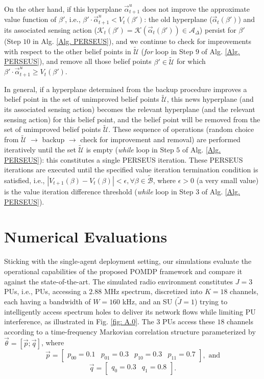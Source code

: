 \documentclass[12pt, draftcls, onecolumn]{IEEEtran}
\begin{document}
On the other hand, if this hyperplane $\vec{\alpha}_{t+1}^{u}$ does not improve the approximate value function of $\beta'$, i.e., $\beta'{\cdot}\vec{\alpha}_{t+1}^{u}{<}V_{t}(\beta')$: the old hyperplane ($\vec{\alpha}_{t}(\beta')$) and its associated sensing action ($\mathcal{K}_{t}(\beta'){=}\mathcal{K}(\vec{\alpha}_{t}(\beta')){\in}\mathcal{A}_{\Delta}$) persist for $\beta'$ (Step $10$ in Alg. \ref{Alg. PERSEUS}), and we continue to check for improvements with respect to the other belief points in $\tilde{\mathcal{U}}$ (\emph{for} loop in Step $9$ of Alg. \ref{Alg. PERSEUS}), and remove all those belief points $\beta'{\in}\tilde{\mathcal{U}}$ for which $\beta'{\cdot}\vec{\alpha}_{t+1}^{u}{\geq}V_{t}(\beta')$.

In general, if a hyperplane determined from the backup procedure improves a belief point in the set of unimproved belief points $\tilde{\mathcal{U}}$, this news hyperplane (and its associated sensing action) becomes the relevant hyperplane (and the relevant sensing action) for this belief point, and the belief point will be removed from the set of unimproved belief points $\tilde{\mathcal{U}}$. These sequence of operations (random choice from $\tilde{\mathcal{U}}$ ${\longrightarrow}$ backup ${\longrightarrow}$ check for improvement and removal) are performed iteratively until the set $\tilde{\mathcal{U}}$ is empty (\emph{while} loop in Step $5$ of Alg. \ref{Alg. PERSEUS}): this constitutes a single PERSEUS iteration. These PERSEUS iterations are executed until the specified value iteration termination condition is satisfied, i.e., $|V_{t+1}(\beta)-V_{t}(\beta)|{<}\epsilon,{\forall}\beta{\in}\tilde{\mathcal{B}}$, where $\epsilon{>}0$ (a very small value) is the value iteration difference threshold (\emph{while} loop in Step $3$ of Alg. \ref{Alg. PERSEUS}).

\section{Numerical Evaluations}\label{III}
Sticking with the single-agent deployment setting, our simulations evaluate the operational capabilities of the proposed POMDP framework and compare it against the state-of-the-art. The simulated radio environment constitutes $J{=}3$ PUs, i.e., PUs, accessing a $2.88$ MHz spectrum, discretized into $K{=}18$ channels, each having a bandwidth of $W{=}160$ kHz, and an SU ($\tilde{J}{=}1$) trying to intelligently access spectrum holes to deliver its network flows while limiting PU interference, as illustrated in Fig. \ref{fig: A.0}. The $3$ PUs access these $18$ channels according to a time-frequency Markovian correlation structure parameterized by
$\vec{\theta}=[\vec{p}; \vec{q}]$, where
\[\vec{p}=\begin{bmatrix}
            p_{00}=0.1 & p_{01}=0.3 & p_{10}=0.3 & p_{11}=0.7
          \end{bmatrix},\text{ and}\]
\[\vec{q}=\begin{bmatrix}
            q_{0}=0.3 & q_{1}=0.8
          \end{bmatrix}.\]
\end{document}
